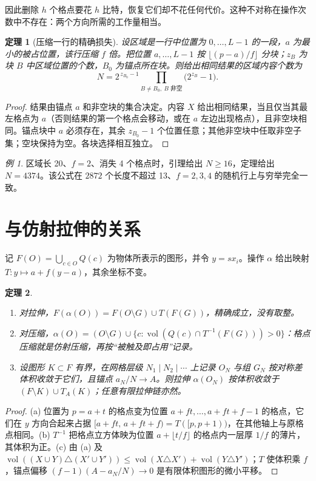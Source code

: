 \documentclass[11pt,a4paper]{article}
\theoremstyle{plain}
\newtheorem{theorem}{定理}
\theoremstyle{definition}
\theoremstyle{remark}
\newtheorem*{example}{例}
\DeclareMathOperator{\vol}{vol}
\begin{document}
因此删除 $h$ 个格点要花 $h$ 比特，恢复它们却不花任何代价。这种不对称在操作次数中不存在：两个方向所需的工作量相当。

\begin{theorem}[压缩一行的精确损失]\label{thm:exact}
设区域是一行中位置为 $0,\dots,L-1$ 的一段，$a$ 为最小的被占位置，该行压缩 $f$ 倍。把位置 $a,\dots,L-1$ 按 $\lfloor (p-a)/f\rfloor$ 分块；$z_B$ 为块 $B$ 中区域位置的个数，$B_0$ 为锚点所在块。则给出相同结果的区域内容个数为
\[
N=2^{\,z_{B_0}-1}\prod_{B\ne B_0,\ B\text{ 非空}}\bigl(2^{z_B}-1\bigr).
\]
\end{theorem}
\begin{proof}
结果由锚点 $a$ 和非空块的集合决定。内容 $X$ 给出相同结果，当且仅当其最左格点为 $a$（否则结果的第一个格点会移动，或在 $a$ 左边出现格点），且非空块相同。锚点块中 $a$ 必须存在，其余 $z_{B_0}-1$ 个位置任意；其他非空块中任取非空子集；空块保持为空。各块选择相互独立。
\end{proof}

\begin{example}
区域长 20、$f=2$、消失 4 个格点时，引理给出 $N\ge16$，定理给出 $N=4374$。该公式在 $2872$ 个长度不超过 13、$f=2,3,4$ 的随机行上与穷举完全一致。
\end{example}

\section{与仿射拉伸的关系}\label{sec:affine}

记 $F(O)=\bigcup_{c\in O}Q(c)$ 为物体所表示的图形，并令 $y=sx_i$。操作 $\alpha$ 给出映射 $T\colon y\mapsto a+f(y-a)$，其余坐标不变。

\begin{theorem}\label{thm:affine}
\begin{enumerate}[label=\upshape(\alph*)]
\item 对拉伸，$F(\alpha(O))=F(O\setminus G)\cup T(F(G))$，精确成立，没有取整。
\item 对压缩，$\alpha(O)=(O\setminus G)\cup\{c: \vol(Q(c)\cap T^{-1}(F(G)))>0\}$：格点压缩就是仿射压缩，再按“被触及即占用”记录。
\item 设图形 $K\subset F$ 有界，在网格层级 $N_1\mid N_2\mid\cdots$ 上记录 $O_N$ 与组 $G_N$ 按对称差体积收敛于它们，且锚点 $a_N/N\to A$。则拉伸 $\alpha(O_N)$ 按体积收敛于 $(F\setminus K)\cup T_A(K)$；任意有限拉伸链亦然。
\end{enumerate}
\end{theorem}
\begin{proof}
(a) 位置为 $p=a+t$ 的格点变为位置 $a+ft,\dots,a+ft+f-1$ 的格点，它们在 $y$ 方向合起来占据 $[a+ft,\,a+ft+f)=T([p,p+1))$，在其他轴上与原格点相同。(b) $T^{-1}$ 把格点立方体映为位置 $a+\lfloor t/f\rfloor$ 的格点内一层厚 $1/f$ 的薄片，其体积为正。(c) 由 (a) 及 $\vol((X\cup Y)\triangle(X'\cup Y'))\le\vol(X\triangle X')+\vol(Y\triangle Y')$；$T$ 使体积乘 $f$，锚点偏移 $(f-1)(A-a_N/N)\to0$ 是有限体积图形的微小平移。
\end{proof}
\end{document}
